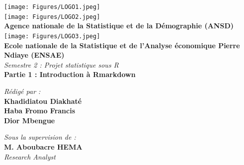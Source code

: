 \documentclass[
]{article}
\author{}
\date{\vspace{-2.5em}}
\begin{document}
\begin{titlepage}
    \begin{center}
        \texttt{[image: Figures/LOGO1.jpeg]} \\[0.1cm]
        \texttt{[image: Figures/LOGO2.jpeg]} \\[0.1cm]
        
        \textbf{\large Agence nationale de la Statistique et de la Démographie (ANSD)}\\[0.2cm]
        
        \texttt{[image: Figures/LOGO3.jpeg]} \\[0.1cm]
        
        \textbf{\large Ecole nationale de la Statistique et de l'Analyse économique Pierre Ndiaye (ENSAE)}\\[0.4cm]
        
        \textit{\LARGE Semestre 2 : Projet statistique sous R }\\[0.3cm]
        \textbf{\Huge \color{blue} \textsf{Partie 1 : Introduction à Rmarkdown}}\\[0.2cm]
        
        \begin{minipage}{0.5\textwidth}
    \begin{flushleft} \large
        \emph{\textsf{Rédigé par :}}\\
        \textbf{Khadidiatou Diakhaté}\\
        \textbf{Haba Fromo Francis}\\
        \textbf{Dior Mbengue}\\
    \end{flushleft}
\end{minipage}
        \hfill
        \begin{minipage}{0.4\textwidth}
            \begin{flushright} \large
                \emph{\textsf{Sous la supervision de :}} \\
                \textbf{M. Aboubacre HEMA}\\
                \textit{Research Analyst }
            \end{flushright}
        \end{minipage}


\end{center}
\end{titlepage}
\end{document}
